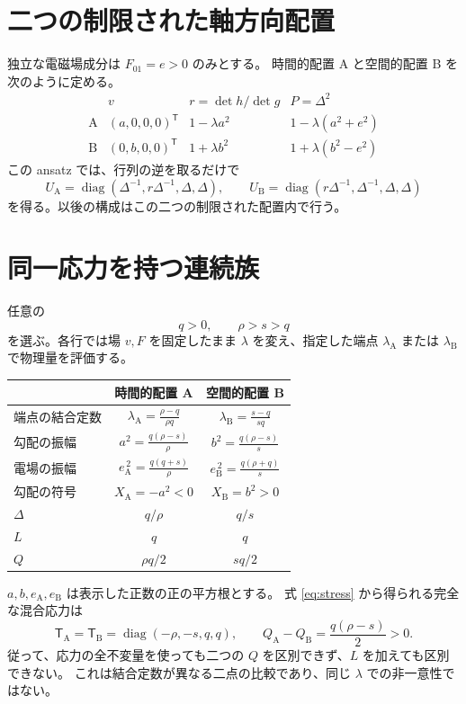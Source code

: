 \documentclass[11pt,a4paper]{article}
\newcommand{\diag}{\operatorname{diag}}
\newcommand{\Tmix}{\mathsf T}
\begin{document}
\section{二つの制限された軸方向配置}
独立な電磁場成分は $F_{01}=e>0$ のみとする。
時間的配置 A と空間的配置 B を次のように定める。
\begin{equation}\label{eq:axial}
\begin{array}{c|c|c|c}
 &v& r=\det h/\det g&P=\Delta^2\\ \hline
\mathrm A &(a,0,0,0)^{\mathsf T}&1-\lambda a^2&1-\lambda(a^2+e^2)\\
\mathrm B &(0,b,0,0)^{\mathsf T}&1+\lambda b^2&1+\lambda(b^2-e^2)
\end{array}
\end{equation}
この ansatz では、行列の逆を取るだけで
\begin{equation}\label{eq:U}
U_{\mathrm A}=\diag(\Delta^{-1},r\Delta^{-1},\Delta,\Delta),\qquad
U_{\mathrm B}=\diag(r\Delta^{-1},\Delta^{-1},\Delta,\Delta)
\end{equation}
を得る。以後の構成はこの二つの制限された配置内で行う。

\newpage
\section{同一応力を持つ連続族}
任意の
\begin{equation}\label{eq:domain}
q>0,\qquad \rho>s>q
\end{equation}
を選ぶ。各行では場 $v,F$ を固定したまま $\lambda$ を変え、指定した端点
$\lambda_{\mathrm A}$ または $\lambda_{\mathrm B}$ で物理量を評価する。
\begin{center}
\renewcommand{\arraystretch}{1.65}
\begin{tabular}{@{}lcc@{}}
\toprule
 & 時間的配置 A & 空間的配置 B\\
\midrule
端点の結合定数 & $\displaystyle\lambda_{\mathrm A}=\frac{\rho-q}{\rho q}$
 & $\displaystyle\lambda_{\mathrm B}=\frac{s-q}{sq}$\\
勾配の振幅 & $\displaystyle a^2=\frac{q(\rho-s)}{\rho}$
 & $\displaystyle b^2=\frac{q(\rho-s)}{s}$\\
電場の振幅 & $\displaystyle e_{\mathrm A}^{\,2}=\frac{q(q+s)}{\rho}$
 & $\displaystyle e_{\mathrm B}^{\,2}=\frac{q(\rho+q)}{s}$\\
勾配の符号 & $X_{\mathrm A}=-a^2<0$ & $X_{\mathrm B}=b^2>0$\\
$\Delta$ & $q/\rho$ & $q/s$\\
$L$ & $q$ & $q$\\
$Q$ & $\rho q/2$ & $sq/2$\\
\bottomrule
\end{tabular}
\end{center}
$a,b,e_{\mathrm A},e_{\mathrm B}$ は表示した正数の正の平方根とする。
式 \eqref{eq:stress} から得られる完全な混合応力は
\begin{equation}\label{eq:same-T}
\boxed{\Tmix_{\mathrm A}=\Tmix_{\mathrm B}=\diag(-\rho,-s,q,q),\qquad
Q_{\mathrm A}-Q_{\mathrm B}=\frac{q(\rho-s)}2>0 .}
\end{equation}
従って、応力の全不変量を使っても二つの $Q$ を区別できず、$L$ を加えても区別できない。
これは結合定数が異なる二点の比較であり、同じ $\lambda$ での非一意性ではない。
\end{document}
